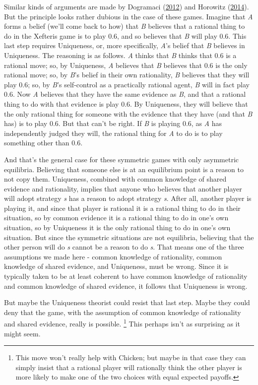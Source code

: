 \documentclass[
  12pt,
  letterpaper,
  DIV=11,
  numbers=noendperiod]{scrreprt}
\begin{document}
Similar kinds of arguments are made by Dogramaci
(\protect\hyperlink{ref-Dogramaci2012}{2012}) and Horowitz
(\protect\hyperlink{ref-Horowitz2014}{2014}). But the principle looks
rather dubious in the case of these games. Imagine that \emph{A} forms a
belief (we'll come back to how) that \emph{B} believes that a rational
thing to do in the Xefteris game is to play 0.6, and so believes that
\emph{B} will play 0.6. This last step requires Uniqueness, or, more
specifically, \emph{A}'s belief that \emph{B} believes in Uniqueness.
The reasoning is as follows. \emph{A} thinks that \emph{B} thinks that
0.6 is a rational move; so, by Uniqueness, \emph{A} believes that
\emph{B} believes that 0.6 is the only rational move; so, by \emph{B}'s
belief in their own rationality, \emph{B} believes that they will play
0.6; so, by \emph{B}'s self-control as a practically rational agent,
\emph{B} will in fact play 0.6. Now \emph{A} believes that they have the
same evidence as \emph{B}, and that a rational thing to do with that
evidence is play 0.6. By Uniqueness, they will believe that the only
rational thing for someone with the evidence that they have (and that
\emph{B} has) is to play 0.6. But that can't be right. If \emph{B} is
playing 0.6, as \emph{A} has independently judged they will, the
rational thing for \emph{A} to do is to play something other than 0.6.

And that's the general case for these symmetric games with only
asymmetric equilibria. Believing that someone else is at an equilibrium
point is a reason to not copy them. Uniqueness, combined with common
knowledge of shared evidence and rationality, implies that anyone who
believes that another player will adopt strategy \emph{s} has a reason
to adopt strategy \emph{s}. After all, another player is playing it, and
since that player is rational it is a rational thing to do in their
situation, so by common evidence it is a rational thing to do in one's
own situation, so by Uniqueness it is the only rational thing to do in
one's own situation. But since the symmetric situations are not
equilibria, believing that the other person will do \emph{s} cannot be a
reason to do \emph{s}. That means one of the three assumptions we made
here - common knowledge of rationality, common knowledge of shared
evidence, and Uniqueness, must be wrong. Since it is typically taken to
be at least coherent to have common knowledge of rationality and common
knowledge of shared evidence, it follows that Uniqueness is wrong.

But maybe the Uniqueness theorist could resist that last step. Maybe
they could deny that the game, with the assumption of common knowledge
of rationality and shared evidence, really is possible. \footnote{This
  move won't really help with Chicken; but maybe in that case they can
  simply insist that a rational player will rationally think the other
  player is more likely to make one of the two choices with equal
  expected payoffs.} This perhaps isn't as surprising as it might seem.
\end{document}
